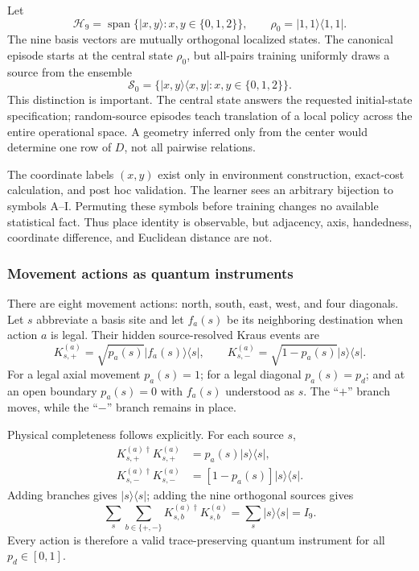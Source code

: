 \documentclass[11pt]{article}
\begin{document}
Let
\begin{equation}
 \mathcal H_9=\operatorname{span}\{\lvert x,y\rangle:
 x,y\in\{0,1,2\}\},\qquad
 \rho_0=\lvert1,1\rangle\!\langle1,1\rvert .
 \label{eq:grid-hilbert}
\end{equation}
The nine basis vectors are mutually orthogonal localized states. The canonical
episode starts at the central state $\rho_0$, but all-pairs training uniformly
draws a source from the ensemble
\begin{equation}
 \mathcal S_0=\{|x,y\rangle\!\langle x,y|:x,y\in\{0,1,2\}\}.
 \label{eq:source-ensemble}
\end{equation}
This distinction is important. The central state answers the requested
initial-state specification; random-source episodes teach translation of a
local policy across the entire operational space. A geometry inferred only
from the center would determine one row of $D$, not all pairwise relations.

The coordinate labels $(x,y)$ exist only in environment construction,
exact-cost calculation, and post hoc validation. The learner sees an arbitrary
bijection to symbols A--I. Permuting these symbols before training changes no
available statistical fact. Thus place identity is observable, but adjacency,
axis, handedness, coordinate difference, and Euclidean distance are not.

\subsubsection{Movement actions as quantum instruments}

There are eight movement actions: north, south, east, west, and four
diagonals. Let $s$ abbreviate a basis site and let $f_a(s)$ be its neighboring
destination when action $a$ is legal. Their hidden source-resolved Kraus events
are
\begin{equation}
 K^{(a)}_{s,+}=\sqrt{p_a(s)}\lvert f_a(s)\rangle\!\langle s\rvert,
 \qquad
 K^{(a)}_{s,-}=\sqrt{1-p_a(s)}\lvert s\rangle\!\langle s\rvert .
 \label{eq:move-kraus}
\end{equation}
For a legal axial movement $p_a(s)=1$; for a legal diagonal
$p_a(s)=p_d$; and at an open boundary $p_a(s)=0$ with $f_a(s)$ understood as
$s$. The ``$+$'' branch moves, while the ``$-$'' branch remains in place.

Physical completeness follows explicitly. For each source $s$,
\begin{align}
 K_{s,+}^{(a)\dagger}K_{s,+}^{(a)}
 &=p_a(s)|s\rangle\!\langle s|,\\
 K_{s,-}^{(a)\dagger}K_{s,-}^{(a)}
 &=[1-p_a(s)]|s\rangle\!\langle s|.
\end{align}
Adding branches gives $|s\rangle\!\langle s|$; adding the nine orthogonal
sources gives
\begin{equation}
 \sum_s\sum_{b\in\{+,-\}}
 K_{s,b}^{(a)\dagger}K_{s,b}^{(a)}
 =\sum_s|s\rangle\!\langle s|=I_9.
 \label{eq:grid-completeness}
\end{equation}
Every action is therefore a valid trace-preserving quantum instrument for all
$p_d\in[0,1]$.
\end{document}
